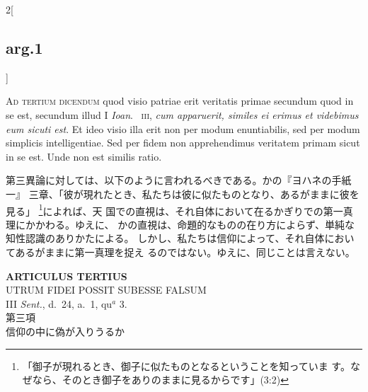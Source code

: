 \documentclass[paper=a4paper,fontsize=10pt,jafontsize=9pt,titlepage]{jlreq}
\begin{document}
\begin{paracol}{2}[\subsection{arg.1}]
\switchcolumn*[\subsection{ad.3}]

{\scshape Ad tertium dicendum} quod visio patriae erit veritatis primae
secundum quod in se est, secundum illud I {\itshape Ioan}.~{\scshape
iii}, {\itshape cum apparuerit, similes ei erimus et videbimus eum
sicuti est}. Et ideo visio illa erit non per modum enuntiabilis, sed per
modum simplicis intelligentiae. Sed per fidem non apprehendimus
veritatem primam sicut in se est. Unde non est similis ratio.

\switchcolumn

第三異論に対しては、以下のように言われるべきである。かの『ヨハネの手紙一』
三章、「彼が現れたとき、私たちは彼に似たものとなり、あるがままに彼を見る」
\footnote{「御子が現れるとき、御子に似たものとなるということを知っていま
す。なぜなら、そのとき御子をありのままに見るからです」(3:2)}によれば、天
国での直視は、それ自体において在るかぎりでの第一真理にかかわる。ゆえに、
かの直視は、命題的なものの在り方によらず、単純な知性認識のありかたによる。
しかし、私たちは信仰によって、それ自体においてあるがままに第一真理を捉え
るのではない。ゆえに、同じことは言えない。

\end{paracol}
\newpage

{}
\setcounter{section}{3}
\setcounter{subsection}{0}
\begin{center}
 {\Large {\bfseries ARTICULUS TERTIUS}}\\
 {\large UTRUM FIDEI POSSIT SUBESSE FALSUM}\\
 {\footnotesize III {\itshape Sent.}, d.~24, a.~1, qu$^a$ 3.}\\
 {\Large 第三項\\信仰の中に偽が入りうるか}
\end{center}
\end{document}
